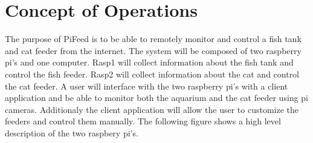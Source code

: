 




\usepackage[compact]{titlesec}





\section{Concept of Operations}
The purpose of PiFeed is to be able to remotely monitor and control a fish tank
and cat feeder from the internet. The system will be composed of two
raspberry pi's and one computer. Rasp1 will collect information about the fish
tank and control the fish feeder. Rasp2 will collect information about the cat
and control the cat feeder. A user will interface with the two raspberry pi's
with a client application and be able to monitor both the aquarium and the cat
feeder using pi cameras. Additionaly the client application will allow the user
to customize the feeders and control them manually. The following figure shows
a high level description of the two raspbery pi's.

